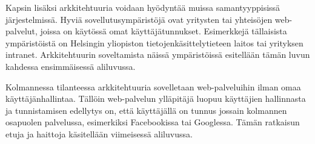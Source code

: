 Kapsin lisäksi arkkitehtuuria voidaan hyödyntää muissa samantyyppisissä järjestelmissä. Hyviä sovellutusympäristöjä ovat yritysten tai yhteisöjen web-palvelut, joissa on käytössä omat käyttäjätunnukset. Esimerkkejä tällaisista ympäristöistä on Helsingin yliopiston tietojenkäsittelytieteen laitos tai yrityksen intranet. Arkkitehtuurin soveltamista näissä ympäristöissä esitellään tämän luvun kahdessa ensimmäisessä aliluvussa.

Kolmannessa tilanteessa arkkitehtuuria sovelletaan web-palveluihin ilman omaa käyttäjänhallintaa. Tällöin web-palvelun ylläpitäjä luopuu käyttäjien hallinnasta ja tunnistamisen edellytys on, että käyttäjällä on tunnus jossain kolmannen osapuolen palvelussa, esimerkiksi Facebookissa tai Googlessa. Tämän ratkaisun etuja ja haittoja käsitellään viimeisessä aliluvussa.
